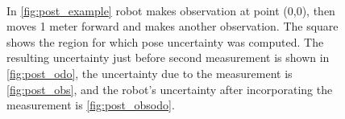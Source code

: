 \begin{figure}
\begin{center}
\\
\quad\space
{}
\end{center}
\caption[Robot pose uncertainty, example]
{In \ref{fig:post_example} robot makes observation at point (0,0),
then moves 1 meter forward and makes another observation. The square
shows the region for which pose uncertainty was computed. The
resulting uncertainty just before second measurement is shown in
\ref{fig:post_odo}, the uncertainty due to the measurement is
\ref{fig:post_obs}, and the robot's uncertainty after incorporating
the measurement is \ref{fig:post_obsodo}.}
\label{fig:post_all}
\end{figure}

